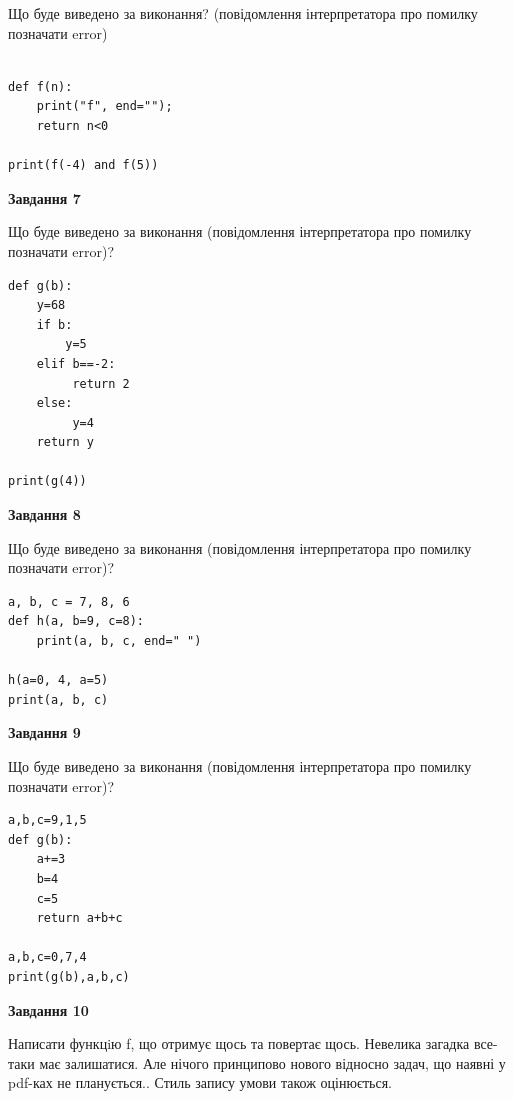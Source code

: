 \documentclass[12pt, ukrainian]{article}
\begin{document}
{\begin {large}
Що буде виведено за виконання? (повідомлення інтерпретатора про помилку позначати error)\par
\begin{verbatim}

def f(n):
    print("f", end="");
    return n<0

print(f(-4) and f(5))
\end{verbatim}

{\begin {center}\textbf{Завдання 7}\end {center}}

Що буде виведено за виконання (повідомлення інтерпретатора про помилку позначати error)?\par
\begin{verbatim}
def g(b):
    y=68
    if b: 
        y=5
    elif b==-2:
         return 2
    else:
         y=4
    return y

print(g(4))
\end{verbatim}

{\begin {center}\textbf{Завдання 8}\end {center}}

Що буде виведено за виконання (повідомлення інтерпретатора про помилку позначати error)?\par
\begin{verbatim}
a, b, c = 7, 8, 6
def h(a, b=9, c=8):
    print(a, b, c, end=" ")

h(a=0, 4, a=5)
print(a, b, c)
\end{verbatim}

{\begin {center}\textbf{Завдання 9}\end {center}}

Що буде виведено за виконання (повідомлення інтерпретатора про помилку позначати error)?\par
\begin{verbatim}
a,b,c=9,1,5
def g(b):
    a+=3
    b=4
    c=5
    return a+b+c

a,b,c=0,7,4
print(g(b),a,b,c)
\end{verbatim}

{\begin {center}\textbf{Завдання 10}\end {center}}


Написати функцiю f, що отримує щось та повертає щось. Невелика загадка все-таки має залишатися. Але нічого принципово нового відносно задач, що наявні у pdf-ках не планується.. Стиль запису умови також оцінюється.\par
\end {large}}
\newpage
\end{document}
